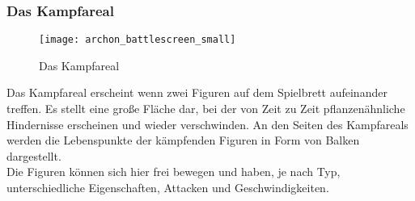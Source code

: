 \subsubsection{Das Kampfareal}
\begin{figure}[htp]
	\centering
	\captionsetup{justification=centering}
	\texttt{[image: archon\_battlescreen\_small]}
	\caption[Kampfareal]{Das Kampfareal}
	\label{fig:Battlescreen}
\end{figure}
Das Kampfareal erscheint wenn zwei Figuren auf dem Spielbrett aufeinander treffen. Es stellt eine große Fläche dar, bei der von Zeit zu Zeit pflanzenähnliche Hindernisse erscheinen und wieder verschwinden. An den Seiten des Kampfareals werden die Lebenspunkte der kämpfenden Figuren in Form von Balken dargestellt.\\
Die Figuren können sich hier frei bewegen und haben, je nach Typ, unterschiedliche Eigenschaften, Attacken und Geschwindigkeiten.

